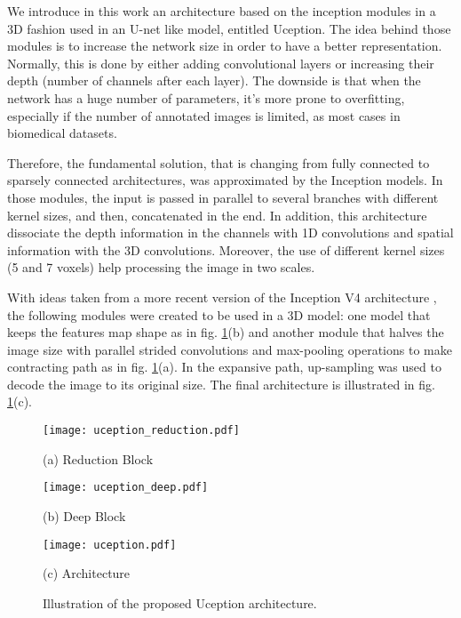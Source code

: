 \documentclass{article}
\begin{document}
We introduce in this work an architecture based on the inception modules \cite{Szegedy2015} in a 3D fashion used in an U-net like model, entitled Uception. The idea behind those modules is to increase the network size in order to have a better representation. Normally, this is done by either adding convolutional layers or increasing their depth (number of channels after each layer). The downside is that when the network has a huge number of parameters, it's more prone to overfitting, especially if the number of annotated images is limited, as most cases in biomedical datasets.

Therefore, the fundamental solution, that is changing from fully connected to sparsely connected architectures, was approximated by the Inception models. In those modules, the input is passed in parallel to several branches with different kernel sizes, and then, concatenated in the end. In addition, this architecture dissociate the depth information in the channels with 1D convolutions and spatial information with the 3D convolutions. Moreover, the use of different kernel sizes (5 and 7 voxels) help processing the image in two scales.

With ideas taken from a more recent version of the Inception V4 architecture \cite{Szegedy2016}, the following modules were created to be used in a 3D model: one model that keeps the features map shape as in fig. \ref{fig:uception}(b) and another module that halves the image size with parallel strided convolutions and max-pooling operations to make contracting path as in fig. \ref{fig:uception}(a). In the expansive path, up-sampling was used to decode the image to its original size. The final architecture is illustrated in fig. \ref{fig:uception}(c).

\begin{figure}[htb]

\begin{minipage}[t]{.48\linewidth}
  \texttt{[image: uception\_reduction.pdf]}
  \centerline{(a) Reduction Block}\medskip
\end{minipage}
\begin{minipage}[t]{0.48\linewidth}
  \texttt{[image: uception\_deep.pdf]}
  \centerline{(b) Deep Block}\medskip
\end{minipage}
\begin{minipage}[t]{0.9\linewidth}
\texttt{[image: uception.pdf]}
\centerline{(c) Architecture}\medskip
\end{minipage}
\caption{Illustration of the proposed Uception architecture.}
\label{fig:uception}

\end{figure}
\end{document}

